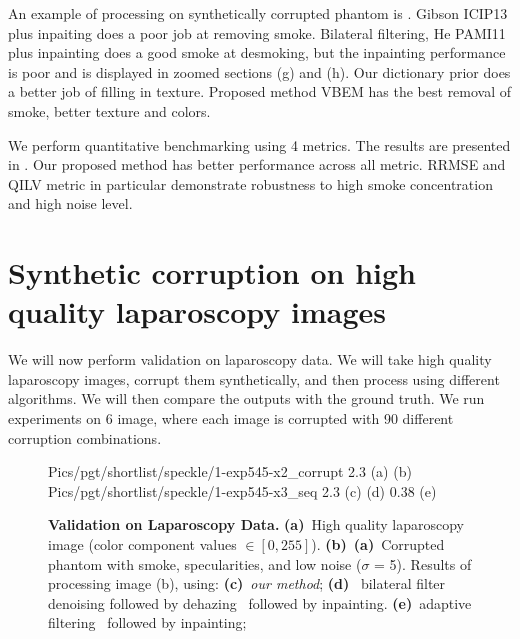 An example of processing on synthetically corrupted phantom is . Gibson ICIP13 \cite{gibson2013wiener} plus inpaiting does a poor job at removing smoke. Bilateral filtering, He PAMI11 \cite{he2011dark} plus inpainting does a good smoke at desmoking, but the inpainting performance is poor and is displayed in zoomed sections (g) and (h). Our dictionary prior does a better job of filling in texture. Proposed method VBEM has the best removal of smoke, better texture and colors.

We perform quantitative benchmarking using 4 metrics. The results are presented in . Our proposed method has better performance across all metric. RRMSE and QILV metric in particular demonstrate robustness to high smoke concentration and high noise level.

\section{Synthetic corruption on high quality laparoscopy images}
We will now perform validation on laparoscopy data. We will take high quality laparoscopy images, corrupt them synthetically, and then process using different algorithms. We will then compare the outputs with the ground truth. We run experiments on 6 image, where each image is corrupted with 90 different corruption combinations.

\begin{figure}[!h]
     {Pics/pgt/shortlist/speckle/1-exp545-x2_corrupt} {2.3} {(a)} {(b)}
     {Pics/pgt/shortlist/speckle/1-exp545-x3_seq} {2.3} {(c)} {(d)}
     {0.38} {(e)}
    \caption
    {
        {\bf Validation on Laparoscopy Data. }
        {\bf (a)}~High quality laparoscopy image (color component values $\in [0,255]$).
        {\bf (b)}~{\bf (a)}~Corrupted phantom with smoke, specularities, and low noise ($\sigma$ = 5).
        Results of processing image (b), using:
        {\bf (c)}~{\em our method};
        {\bf (d)}~ bilateral filter denoising followed by dehazing~\cite{he2011dark} followed by inpainting.
        {\bf (e)}~adaptive filtering~\cite{gibson2013wiener} followed by inpainting;
    }
    \label{fig:imagesPgt1}
\end{figure}


